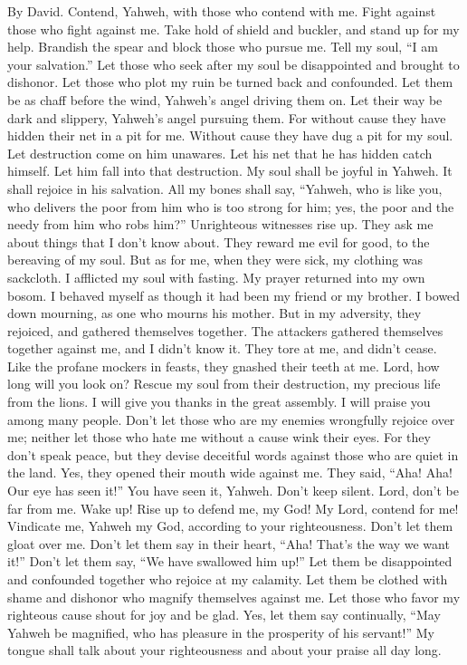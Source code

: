By David.  Contend, Yahweh, with those who contend with
me. Fight against those who fight against me.  Take hold
of shield and buckler, and stand up for my help.  Brandish
the spear and block those who pursue me. Tell my soul, ``I am your
salvation.''  Let those who seek after my soul be
disappointed and brought to dishonor. Let those who plot my ruin be
turned back and confounded.  Let them be as chaff before
the wind, Yahweh's angel driving them on.  Let their way
be dark and slippery, Yahweh's angel pursuing them.  For
without cause they have hidden their net in a pit for me. Without cause
they have dug a pit for my soul.  Let destruction come on
him unawares. Let his net that he has hidden catch himself. Let him fall
into that destruction.  My soul shall be joyful in Yahweh.
It shall rejoice in his salvation.  All my bones shall
say, ``Yahweh, who is like you, who delivers the poor from him who is
too strong for him; yes, the poor and the needy from him who robs him?''
 Unrighteous witnesses rise up. They ask me about things
that I don't know about.  They reward me evil for good,
to the bereaving of my soul.  But as for me, when they
were sick, my clothing was sackcloth. I afflicted my soul with fasting.
My prayer returned into my own bosom.  I behaved myself
as though it had been my friend or my brother. I bowed down mourning, as
one who mourns his mother.  But in my adversity, they
rejoiced, and gathered themselves together. The attackers gathered
themselves together against me, and I didn't know it. They tore at me,
and didn't cease.  Like the profane mockers in feasts,
they gnashed their teeth at me.  Lord, how long will you
look on? Rescue my soul from their destruction, my precious life from
the lions.  I will give you thanks in the great assembly.
I will praise you among many people.  Don't let those who
are my enemies wrongfully rejoice over me; neither let those who hate me
without a cause wink their eyes.  For they don't speak
peace, but they devise deceitful words against those who are quiet in
the land.  Yes, they opened their mouth wide against me.
They said, ``Aha! Aha! Our eye has seen it!''  You have
seen it, Yahweh. Don't keep silent. Lord, don't be far from me.
 Wake up! Rise up to defend me, my God! My Lord, contend
for me!  Vindicate me, Yahweh my God, according to your
righteousness. Don't let them gloat over me.  Don't let
them say in their heart, ``Aha! That's the way we want it!'' Don't let
them say, ``We have swallowed him up!''  Let them be
disappointed and confounded together who rejoice at my calamity. Let
them be clothed with shame and dishonor who magnify themselves against
me.  Let those who favor my righteous cause shout for joy
and be glad. Yes, let them say continually, ``May Yahweh be magnified,
who has pleasure in the prosperity of his servant!''  My
tongue shall talk about your righteousness and about your praise all day
long.

